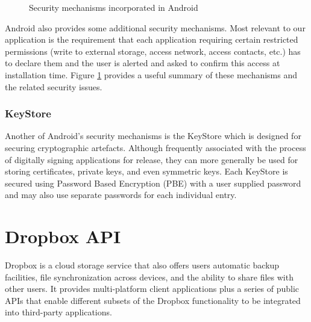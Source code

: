 \begin{figure}[h!]
                                                                                                                                                                                                                                                                                                                                                                                                                                                                                                                                        
\caption[Security table]{Security mechanisms incorporated in Android \citep{shabtai2010google}}\label{fg:overview_pyramid}
        \label{fig:table}
\end{figure}

Android also provides some additional security mechanisms. Most relevant to our application is the requirement that each application requiring certain restricted permissions (write to external storage, access network, access contacts, etc.) has to declare them and the user is alerted and asked to confirm this access at installation time.  Figure \ref{fig:table} provides a useful summary of these mechanisms and the related security issues.

\subsubsection*{KeyStore}

Another of Android's security mechanisms is the KeyStore which is designed for securing cryptographic artefacts.  Although frequently associated with the process of digitally signing applications for release, they can more generally be used for storing certificates, private keys, and even symmetric keys.  Each KeyStore is secured using Password Based Encryption (PBE) with a user supplied password and may also use separate passwords for each individual entry.



\section{Dropbox API}
\label{sec:dropbox}
Dropbox is a cloud storage service that also offers users  automatic backup facilities, file synchronization across devices, and the ability to share files with other users.  It provides multi-platform client applications plus a series of public APIs that enable different subsets of the Dropbox functionality to be integrated into third-party applications.  

